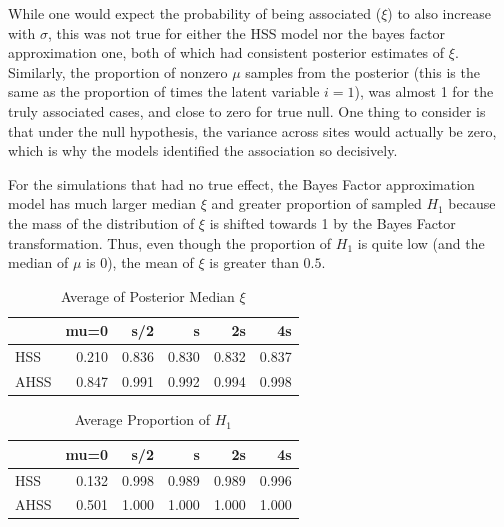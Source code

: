 \documentclass[AMA,STIX1COL]{WileyNJD-v2}\usepackage[]{graphicx}\usepackage[]{color}
\newenvironment{knitrout}{}{} %
\begin{document}
While one would expect the probability of being associated ($\xi$) to also increase with $\sigma$, this was not true for either the HSS model nor the bayes factor approximation one, both of which had consistent posterior estimates of $\xi$. Similarly, the proportion of nonzero $\mu$ samples from the posterior (this is the same as the proportion of times the latent variable $i = 1$), was almost 1 for the truly associated cases, and close to zero for true null. One thing to consider is that under the null hypothesis, the variance across sites would actually be zero, which is why the models identified the association so decisively.

For the simulations that had no true effect, the Bayes Factor approximation model has much larger median $\xi$ and greater proportion of sampled $H_1$ because the mass of the distribution of $\xi$ is shifted towards 1 by the Bayes Factor transformation. Thus, even though the proportion of $H_1$ is quite low (and the median of $\mu$ is 0), the mean of $\xi$ is greater than $0.5$.


\begin{knitrout}
\color{fgcolor}\begin{table}

\caption{\label{tab:unnamed-chunk-25}Average of Posterior Median $\xi$}
\centering
\begin{tabular}[t]{l|r|r|r|r|r}
\hline
  & mu=0 & s/2 & s & 2s & 4s\\
\hline
HSS & 0.210 & 0.836 & 0.830 & 0.832 & 0.837\\
\hline
AHSS & 0.847 & 0.991 & 0.992 & 0.994 & 0.998\\
\hline
\end{tabular}
\end{table}


\end{knitrout}

\begin{knitrout}
\color{fgcolor}\begin{table}

\caption{\label{tab:unnamed-chunk-26}Average Proportion of $H_1$}
\centering
\begin{tabular}[t]{l|r|r|r|r|r}
\hline
  & mu=0 & s/2 & s & 2s & 4s\\
\hline
HSS & 0.132 & 0.998 & 0.989 & 0.989 & 0.996\\
\hline
AHSS & 0.501 & 1.000 & 1.000 & 1.000 & 1.000\\
\hline
\end{tabular}
\end{table}


\end{knitrout}
\end{document}
